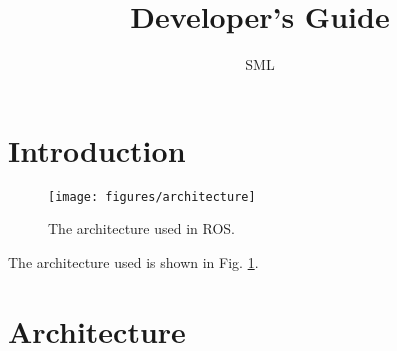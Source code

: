 \documentclass[titlepage,11pt,a4paper]{article}
\title{Developer's Guide}
\author{SML}
\begin{document}
\maketitle

\section{Introduction}

\begin{figure}[t]                                                               
  \centering                                                                      
  \texttt{[image: figures/architecture]}                             
  \caption{The architecture used in ROS.}
  \label{fig:architecture}                                                              
\end{figure}

The architecture used is shown in Fig. \ref{fig:architecture}.

\section{Architecture}
\end{document}
